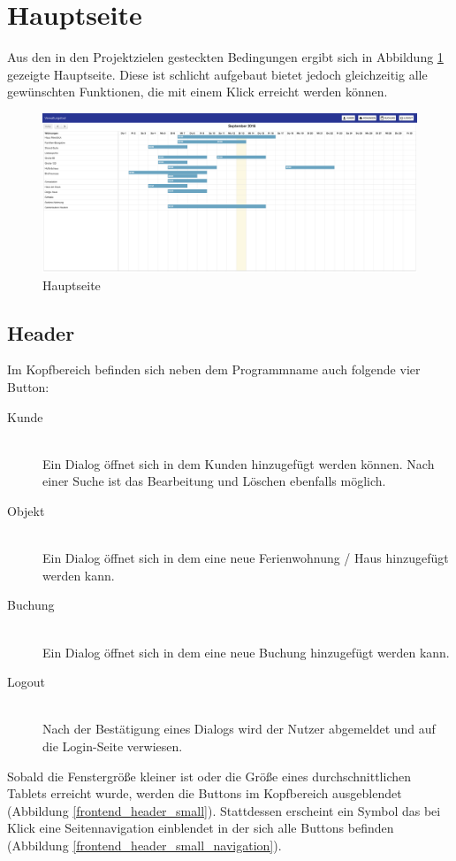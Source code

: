 \section{Hauptseite}
Aus den in den Projektzielen gesteckten Bedingungen ergibt sich in Abbildung \ref{frontend_mainpage} gezeigte Hauptseite. Diese ist schlicht aufgebaut bietet jedoch gleichzeitig alle gewünschten Funktionen, die mit einem Klick erreicht werden können.

\begin{figure}[H]
\centering\includegraphics[width=1\textwidth]{images/frontend_mainpage.png}
\caption{Hauptseite}
\label{frontend_mainpage}
\end{figure}

\subsection{Header}
Im Kopfbereich befinden sich neben dem Programmname auch folgende vier Button:

\begin{description}
\item[Kunde]\hfill \\
Ein Dialog öffnet sich in dem Kunden hinzugefügt werden können. Nach einer Suche ist das Bearbeitung und Löschen ebenfalls möglich.
\item[Objekt]\hfill \\ 
Ein Dialog öffnet sich in dem eine neue Ferienwohnung / Haus hinzugefügt werden kann. 
\item[Buchung]\hfill \\ 
Ein Dialog öffnet sich in dem eine neue Buchung hinzugefügt werden kann. 
\item[Logout]\hfill \\ 
Nach der Bestätigung eines Dialogs wird der Nutzer abgemeldet und auf die Login-Seite verwiesen. 
\end{description}

Sobald die Fenstergröße kleiner ist oder die Größe eines durchschnittlichen Tablets erreicht wurde, werden die Buttons im Kopfbereich ausgeblendet (Abbildung \ref{frontend_header_small}). Stattdessen erscheint ein Symbol das bei Klick eine Seitennavigation einblendet in der sich alle Buttons befinden (Abbildung \ref{frontend_header_small_navigation}).

